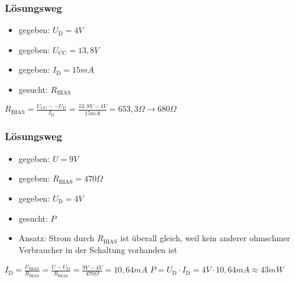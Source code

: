 \begin{frame}
\frametitle{Lösungsweg}
\begin{itemize}
  \item gegeben: $U_{\textrm{D}} = 4V$
  \item gegeben: $U_{\textrm{CC}} = 13,8V$
  \item gegeben: $I_{\textrm{D}} = 15mA$
  \item gesucht: $R_{\textrm{BIAS}}$
  \end{itemize}
    \pause
    $R_{\textrm{BIAS}} = \frac{U_{\textrm{CC}} -- U_{\textrm{D}}}{I_{\textrm{D}}} = \frac{13,8V -4V}{15mA} = 653,3\Omega \rightarrow 680\Omega$



\end{frame}

\begin{frame}
\end{frame}

\begin{frame}
\frametitle{Lösungsweg}
\begin{itemize}
  \item gegeben: $U = 9V$
  \item gegeben: $R_{\textrm{BIAS}} = 470\Omega$
  \item gegeben: $U_{\textrm{D}} = 4V$
  \item gesucht: $P$
  \item Ansatz: Strom durch $R_{\textrm{BIAS}}$ ist überall gleich, weil kein anderer ohmschmer Verbraucher in der Schaltung vorhanden ist
  \end{itemize}
    \pause
    $I_{\textrm{D}} = \frac{U_{\textrm{BIAS}}}{R_{\textrm{BIAS}}} = \frac{U-U_{\textrm{D}}}{R_{\textrm{BIAS}}} = \frac{9V-4V}{470\Omega} = 10,64mA$
    \pause
    $P = U_{\textrm{D}} \cdot I_{\textrm{D}} = 4V \cdot 10,64mA \approx 43mW$



\end{frame}%
